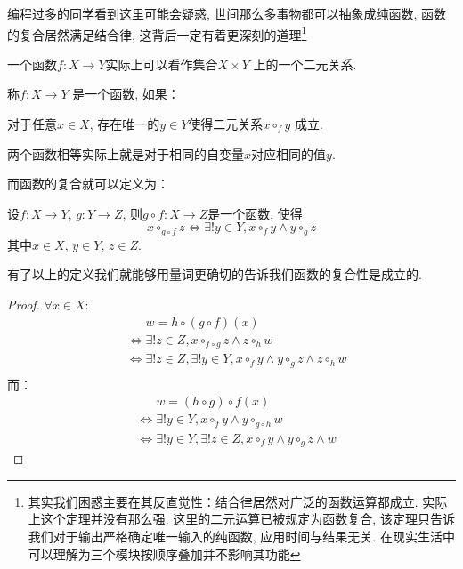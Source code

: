 编程过多的同学看到这里可能会疑惑, 世间那么多事物都可以抽象成纯函数, 函数的复合居然满足结合律,
这背后一定有着更深刻的道理\footnote{其实我们困惑主要在其反直觉性：结合律居然对广泛的函数运算都成立.
    实际上这个定理并没有那么强. 这里的二元运算已被规定为函数复合, 该定理只告诉我们对于输出严格确定唯一输入的纯函数,
应用时间与结果无关. 在现实生活中可以理解为三个模块按顺序叠加并不影响其功能}

一个函数\(f: X \to Y\)实际上可以看作集合\(X \times Y\) 上的一个二元关系.

\begin{definition}
    称\(f: X\to Y\) 是一个函数, 如果：

    对于任意\(x\in X\), 存在唯一的\(y\in Y\)使得二元关系\(x \circ_{f} y\) 成立.
\end{definition}

两个函数相等实际上就是对于相同的自变量\(x\)对应相同的值\(y\).

而函数的复合就可以定义为：
\begin{definition}
    设\(f: X\to Y\), \(g: Y\to Z\), 则\(g\circ f: X \to Z\)是一个函数, 使得
    \[
        x \circ_{g\circ f} z \iff \exists! y \in Y, x
        \circ_{f} y \land y \circ_{g} z
    \]
    其中\(x\in X\), \(y\in Y\), \(z\in Z\).
\end{definition}
有了以上的定义我们就能够用量词更确切的告诉我们函数的复合性是成立的.

\begin{proof}
    \(\forall x \in X\):
    \begin{align*}
        &\mathrel{\phantom{\iff}}w=h \circ(g\circ f)(x) \\
        &\iff \exists! z \in Z, x \circ_{f\circ g} z \land z
        \circ_{h} w\\
        &\iff \exists! z \in Z, \exists! y \in Y, x
        \circ_{f} y \land y \circ_{g} z \land z
        \circ_{h} w\\
    \end{align*}
    而：
    \begin{align*}
        &\mathrel{\phantom{\iff}}w=(h\circ g)\circ f(x) \\
        &\iff \exists! y \in Y, x \circ_{f} y \land y
        \circ_{g \circ h} w\\
        &\iff \exists! y \in Y, \exists! z \in Z, x
        \circ_{f} y \land y
        \circ_{g} z \land w
    \end{align*}
\end{proof}



